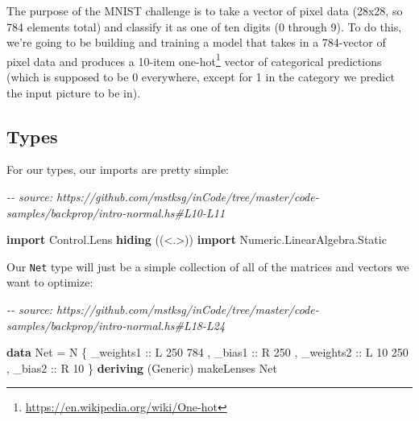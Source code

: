 \documentclass[]{article}
\newenvironment{Shaded}{}{}
\newcommand{\CommentTok}[1]{\textcolor[rgb]{0.38,0.63,0.69}{\textit{#1}}}
\newcommand{\DataTypeTok}[1]{\textcolor[rgb]{0.56,0.13,0.00}{#1}}
\newcommand{\DecValTok}[1]{\textcolor[rgb]{0.25,0.63,0.44}{#1}}
\newcommand{\KeywordTok}[1]{\textcolor[rgb]{0.00,0.44,0.13}{\textbf{#1}}}
\newcommand{\NormalTok}[1]{#1}
\newcommand{\OtherTok}[1]{\textcolor[rgb]{0.00,0.44,0.13}{#1}}
\renewcommand{\href}[2]{#2\footnote{\url{#1}}}
\begin{document}
The purpose of the MNIST challenge is to take a vector of pixel data (28x28, so
784 elements total) and classify it as one of ten digits (0 through 9). To do
this, we're going to be building and training a model that takes in a 784-vector
of pixel data and produces a 10-item
\href{https://en.wikipedia.org/wiki/One-hot}{one-hot} vector of categorical
predictions (which is supposed to be 0 everywhere, except for 1 in the category
we predict the input picture to be in).

\subsection{Types}\label{types}

For our types, our imports are pretty simple:

\begin{Shaded}
\begin{Highlighting}[]
\CommentTok{{-}{-} source: https://github.com/mstksg/inCode/tree/master/code{-}samples/backprop/intro{-}normal.hs\#L10{-}L11}

\KeywordTok{import}           \DataTypeTok{Control.Lens} \KeywordTok{hiding}\NormalTok{          ((\textless{}.\textgreater{}))}
\KeywordTok{import}           \DataTypeTok{Numeric.LinearAlgebra.Static}
\end{Highlighting}
\end{Shaded}

Our \texttt{Net} type will just be a simple collection of all of the matrices
and vectors we want to optimize:

\begin{Shaded}
\begin{Highlighting}[]
\CommentTok{{-}{-} source: https://github.com/mstksg/inCode/tree/master/code{-}samples/backprop/intro{-}normal.hs\#L18{-}L24}

\KeywordTok{data} \DataTypeTok{Net} \OtherTok{=} \DataTypeTok{N}\NormalTok{ \{}\OtherTok{ \_weights1 ::} \DataTypeTok{L} \DecValTok{250} \DecValTok{784}
\NormalTok{             ,}\OtherTok{ \_bias1    ::} \DataTypeTok{R} \DecValTok{250}
\NormalTok{             ,}\OtherTok{ \_weights2 ::} \DataTypeTok{L} \DecValTok{10} \DecValTok{250}
\NormalTok{             ,}\OtherTok{ \_bias2    ::} \DataTypeTok{R} \DecValTok{10}
\NormalTok{             \}}
  \KeywordTok{deriving}\NormalTok{ (}\DataTypeTok{Generic}\NormalTok{)}
\NormalTok{makeLenses \textquotesingle{}}\DataTypeTok{\textquotesingle{}Net}
\end{Highlighting}
\end{Shaded}
\end{document}
